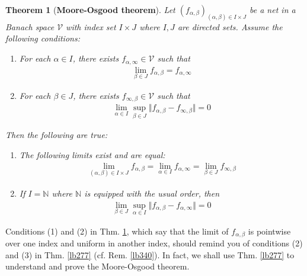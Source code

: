 \documentclass[12pt,b5paper,notitlepage]{article}
\theoremstyle{definition}
\theoremstyle{plain}
\newtheorem{thm}[df]{Theorem}
\newcommand{\mc}{\mathcal}
\newcommand{\Nbb}{\mathbb N}
\numberwithin{equation}{section}
\begin{document}
\begin{thm}[\textbf{Moore-Osgood theorem}]\label{lb289}  
Let $(f_{\alpha,\beta})_{(\alpha,\beta)\in I\times J}$ be a net in a Banach space $\mc V$ with index set $I\times J$ where $I,J$ are directed sets. Assume the following conditions:
\begin{enumerate}[label=(\arabic*)]
\item For each $\alpha\in I$, there exists $f_{\alpha,\infty}\in\mc V$ such that 
\begin{align}
\lim_{\beta\in J} f_{\alpha,\beta}=f_{\alpha,\infty}
\end{align}
\item For each $\beta\in J$, there exists $f_{\infty,\beta}\in\mc V$ such that
\begin{align}
\lim_{\alpha\in I}\sup_{\beta\in J}\Vert f_{\alpha,\beta}-f_{\infty,\beta}\Vert=0
\end{align}
\end{enumerate}
Then the following are true:
\begin{enumerate}
\item The following limits exist and are equal:
\begin{align}
\lim_{(\alpha,\beta)\in I\times J}f_{\alpha,\beta}=\lim_{\alpha\in I}f_{\alpha,\infty}=\lim_{\beta\in J}f_{\infty,\beta}
\end{align}
\item If $I=\Nbb$ where $\Nbb$ is equipped with the usual order, then
\begin{align}\label{eq89}
\lim_{\beta\in J}\sup_{\alpha\in I}\Vert f_{\alpha,\beta}-f_{\alpha,\infty}\Vert=0
\end{align}
\end{enumerate}
\end{thm}

Conditions (1) and (2) in Thm. \ref{lb289}, which say that the limit of $f_{\alpha,\beta}$ is pointwise over one index and uniform in another index, should remind you of conditions (2) and (3) in Thm. \ref{lb277} (cf. Rem. \ref{lb340}). In fact, we shall use Thm. \ref{lb277} to understand and prove the Moore-Osgood theorem.
\end{document}
